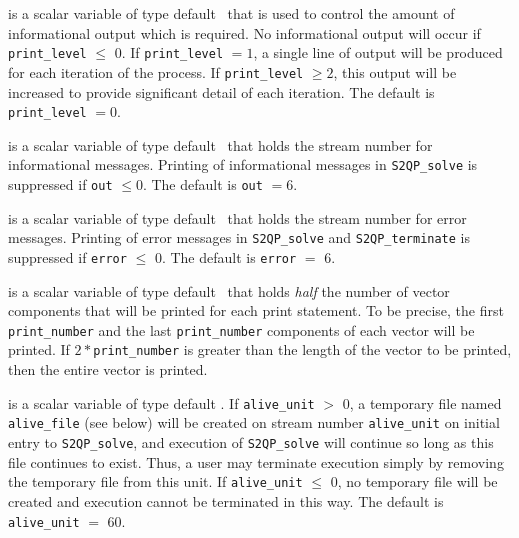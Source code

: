\documentclass{galahad}
\newcommand{\packagename}{S2QP}
\begin{document}
\begin{description}

 is a scalar variable of type default \integer\ that is used
to control the amount of informational output which is required. No
informational output will occur if {\tt print\_level} $\leq$ 0.
If {\tt print\_level} $= 1$, a single line of output will be produced for each
iteration of the process. If {\tt print\_level} $\geq 2$, this output will be
increased to provide significant detail of each iteration.
The default is {\tt print\_level} $= 0$.

 is a scalar variable of type default \integer\ that holds the
stream number for informational messages.
Printing of informational messages in
{\tt \packagename\_solve}
is suppressed if {\tt out} $\leq 0$.
The default is {\tt out} $= 6$.

 is a scalar variable of type default \integer\ that holds the
stream number for error messages.
Printing of error messages in
{\tt \packagename\_solve}
and
{\tt \packagename\_terminate}
is suppressed if {\tt error} $\leq$ 0.
The default is {\tt error} $=$ 6.

 is a scalar variable of type default \integer\
that holds {\em half} the number of vector components that will be
printed for each print statement.  To be precise, the first {\tt
  print\_number} and the last {\tt print\_number} components of each
vector will be printed.  If $2\ast${\tt print\_number} is greater than the
length of the vector to be printed, then the entire vector is printed.

 is a scalar variable of type default \integer.
If {\tt alive\_unit} $>$ 0, a temporary file named {\tt alive\_file} (see below)
will be created on stream number {\tt alive\_unit} on initial entry to
{\tt \packagename\_solve}, and execution of {\tt \packagename\_solve} will continue so
long as this file continues to exist. Thus, a user may terminate execution
simply by removing the temporary file from this unit.
If {\tt alive\_unit} $\leq$ 0, no temporary file will be created and
execution cannot be terminated in this way.
The default is {\tt alive\_unit} $=$ 60.





\end{description}
\end{document}
